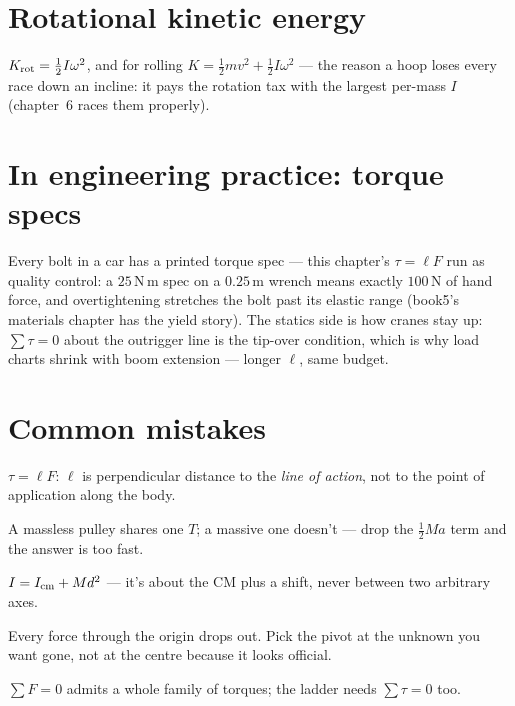 \section{Rotational kinetic energy}\label{sec:rot-ke}

$K_{\rm rot}=\tfrac12I\omega^{2}$, and for rolling
$K=\tfrac12mv^{2}+\tfrac12I\omega^{2}$ --- the reason a hoop loses every
race down an incline: it pays the rotation tax with the largest per-mass
$I$ (chapter~6 races them properly).

\section{In engineering practice: torque specs}\label{sec:rot-eng}

Every bolt in a car has a printed torque spec --- this chapter's
$\tau=\ell F$ run as quality control: a $25$\,N\,m spec on a $0.25$\,m
wrench means exactly $100$\,N of hand force, and overtightening stretches
the bolt past its elastic range (book5's materials chapter has the yield
story). The statics side is how cranes stay up: $\sum\tau=0$ about the
outrigger line is the tip-over condition, which is why load charts shrink
with boom extension --- longer $\ell$, same budget.

\section{Common mistakes}\label{sec:rot-mistakes}

\begin{tripwire}
$\tau=\ell F$: $\ell$ is perpendicular distance to the \emph{line of
action}, not to the point of application along the body.
\end{tripwire}
\begin{tripwire}
A massless pulley shares one $T$; a massive one doesn't --- drop the
$\tfrac12Ma$ term and the answer is too fast.
\end{tripwire}
\begin{tripwire}
$I=I_{\rm cm}+Md^{2}$ --- it's about the CM plus a shift, never between
two arbitrary axes.
\end{tripwire}
\begin{tripwire}
Every force through the origin drops out. Pick the pivot at the unknown
you want gone, not at the centre because it looks official.
\end{tripwire}
\begin{tripwire}
$\sum F=0$ admits a whole family of torques; the ladder needs
$\sum\tau=0$ too.
\end{tripwire}

